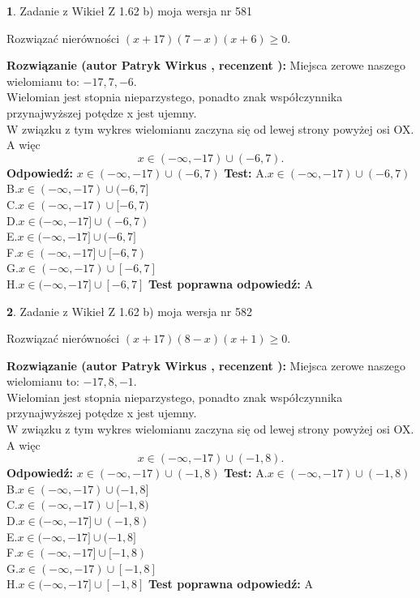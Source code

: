 \documentclass[12pt, a4paper]{article}
\theoremstyle{definition} %
\newtheorem{zad}{}
\newcommand{\zadStart}[1]{\begin{zad}#1\newline}
\newcommand{\zadStop}{\end{zad}}
\newcommand{\rozwStart}[2]{\noindent \textbf{Rozwiązanie (autor #1 , recenzent #2): }\newline}
\newcommand{\rozwStop}{\newline}
\newcommand{\odpStart}{\noindent \textbf{Odpowiedź:}\newline}
\newcommand{\odpStop}{\newline}
\newcommand{\testStart}{\noindent \textbf{Test:}\newline}
\newcommand{\testStop}{\newline}
\newcommand{\kluczStart}{\noindent \textbf{Test poprawna odpowiedź:}\newline}
\newcommand{\kluczStop}{\newline}
\begin{document}
\zadStart{Zadanie z Wikieł Z 1.62 b) moja wersja nr 581}

Rozwiązać nierówności $(x+17)(7-x)(x+6)\ge0$.
\zadStop
\rozwStart{Patryk Wirkus}{}
Miejsca zerowe naszego wielomianu to: $-17, 7, -6$.\\
Wielomian jest stopnia nieparzystego, ponadto znak współczynnika przy\linebreak najwyższej potędze x jest ujemny.\\ W związku z tym wykres wielomianu zaczyna się od lewej strony powyżej osi OX. A więc $$x \in (-\infty,-17) \cup (-6,7).$$
\rozwStop
\odpStart
$x \in (-\infty,-17) \cup (-6,7)$
\odpStop
\testStart
A.$x \in (-\infty,-17) \cup (-6,7)$\\
B.$x \in (-\infty,-17) \cup (-6,7]$\\
C.$x \in (-\infty,-17) \cup [-6,7)$\\
D.$x \in (-\infty,-17] \cup (-6,7)$\\
E.$x \in (-\infty,-17] \cup (-6,7]$\\
F.$x \in (-\infty,-17] \cup [-6,7)$\\
G.$x \in (-\infty,-17) \cup [-6,7]$\\
H.$x \in (-\infty,-17] \cup [-6,7]$
\testStop
\kluczStart
A
\kluczStop



\zadStart{Zadanie z Wikieł Z 1.62 b) moja wersja nr 582}

Rozwiązać nierówności $(x+17)(8-x)(x+1)\ge0$.
\zadStop
\rozwStart{Patryk Wirkus}{}
Miejsca zerowe naszego wielomianu to: $-17, 8, -1$.\\
Wielomian jest stopnia nieparzystego, ponadto znak współczynnika przy\linebreak najwyższej potędze x jest ujemny.\\ W związku z tym wykres wielomianu zaczyna się od lewej strony powyżej osi OX. A więc $$x \in (-\infty,-17) \cup (-1,8).$$
\rozwStop
\odpStart
$x \in (-\infty,-17) \cup (-1,8)$
\odpStop
\testStart
A.$x \in (-\infty,-17) \cup (-1,8)$\\
B.$x \in (-\infty,-17) \cup (-1,8]$\\
C.$x \in (-\infty,-17) \cup [-1,8)$\\
D.$x \in (-\infty,-17] \cup (-1,8)$\\
E.$x \in (-\infty,-17] \cup (-1,8]$\\
F.$x \in (-\infty,-17] \cup [-1,8)$\\
G.$x \in (-\infty,-17) \cup [-1,8]$\\
H.$x \in (-\infty,-17] \cup [-1,8]$
\testStop
\kluczStart
A
\kluczStop
\end{document}
